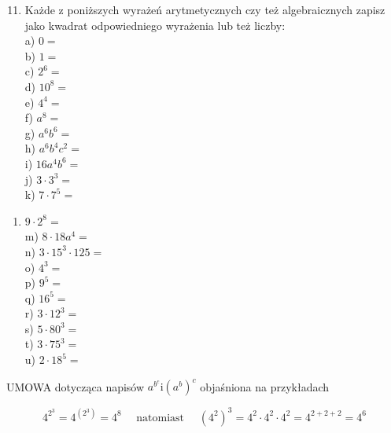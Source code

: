 \documentclass[10pt]{article}
\begin{document}
\begin{enumerate}
  \setcounter{enumi}{10}
  \item Każde z poniższych wyrażeń arytmetycznych czy też algebraicznych zapisz jako kwadrat odpowiedniego wyrażenia lub też liczby:\\
a) \(0=\)\\
b) \(1=\)\\
c) \(2^{6}=\)\\
d) \(10^{8}=\)\\
e) \(4^{4}=\)\\
f) \(a^{8}=\)\\
g) \(a^{6} b^{6}=\)\\
h) \(a^{6} b^{4} c^{2}=\)\\
i) \(16 a^{4} b^{6}=\)\\
j) \(3 \cdot 3^{3}=\)\\
k) \(7 \cdot 7^{5}=\)
\end{enumerate}

\begin{enumerate}
  \item \(9 \cdot 2^{8}=\)\\
m) \(8 \cdot 18 a^{4}=\)\\
n) \(3 \cdot 15^{3} \cdot 125=\)\\
o) \(4^{3}=\)\\
p) \(9^{5}=\)\\
q) \(16^{5}=\)\\
r) \(3 \cdot 12^{3}=\)\\
s) \(5 \cdot 80^{3}=\)\\
t) \(3 \cdot 75^{3}=\)\\
u) \(2 \cdot 18^{5}=\)
\end{enumerate}

UMOWA dotycząca napisów \(a^{b^{c}} \mathrm{i}\left(a^{b}\right)^{c}\) objaśniona na przykładach

\[
4^{2^{3}}=4^{\left(2^{3}\right)}=4^{8} \quad \text { natomiast } \quad\left(4^{2}\right)^{3}=4^{2} \cdot 4^{2} \cdot 4^{2}=4^{2+2+2}=4^{6}
\]
\end{document}
